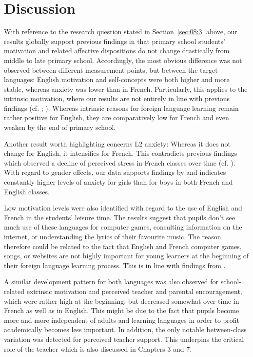 \documentclass[output=paper]{langsci/langscibook}
\begin{document}
\section{Discussion}

With reference to the research question stated in Section~\ref{sec:08:3} above, our results globally support previous findings in that primary school students’ motivation and related affective dispositions do not change drastically from middle to late primary school. Accordingly, the most obvious difference was not observed between different measurement points, but between the target languages: English motivation and self-concepts were both higher and more stable, whereas anxiety was lower than in French. Particularly, this applies to the intrinsic motivation, where our results are not entirely in line with previous findings (cf. \citealt{Heinzmann2013}; \citealt{BruehwilerLePapeRacine2017}). Whereas intrinsic reasons for foreign language learning remain rather positive for English, they are comparatively low for French and even weaken by the end of primary school.

Another result worth highlighting concerns L2 anxiety: Whereas it does not change for English, it intensifies for French. This contradicts previous findings which observed a decline of perceived stress in French classes over time (cf. \citealt{SinghElmiger2017}). With regard to gender effects, our data supports findings by \citet{DewaeleEtAl2016} and indicates constantly higher levels of anxiety for girls than for boys in both French and English classes.

Low motivation levels were also identified with regard to the use of English and French in the students’ leisure time. The results suggest that pupils don’t see much use of these languages for computer games, consulting information on the internet, or understanding the lyrics of their favourite music. The reason therefore could be related to the fact that English and French computer games, songs, or websites are not highly important for young learners at the beginning of their foreign language learning process. This is in line with findings from \citet{Heinzmann2013}.

A similar development pattern for both languages was also observed for school-related extrinsic motivation and perceived teacher and parental encouragement, which were rather high at the beginning, but decreased somewhat over time in French as well as in English. This might be due to the fact that pupils become more and more independent of adults and learning languages in order to profit academically becomes less important. In addition, the only notable between-class variation was detected for perceived teacher support. This underpins the critical role of the teacher which is also discussed in Chapters 3 and 7. 
\end{document}
